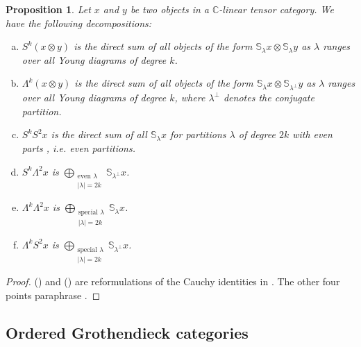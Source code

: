 \documentclass[11pt]{article}
\theoremstyle{plain}
\newtheorem{proposition}[lemma]{Proposition}
\theoremstyle{nonumberplain}
\theoremstyle{plain}
\numberwithin{equation}{section}
\theoremstyle{nonumberplain}
\newtheorem{proof}{Proof}
\newcommand\bC{{\mathbb C}}
\newcommand\bS{{\mathbb S}}
\newcommand\1{{\bf 1}}
\begin{document}
\begin{proposition}\label{pr.plth}
  Let $x$ and $y$ be two objects in a $\bC$-linear tensor category. We have the following decompositions:
  \begin{enumerate}[(a)]
  \item\label{item:1} $S^k(x\otimes y)$ is the direct sum of all objects of the form $\mathbb{S}_{\lambda}x\otimes \mathbb{S}_{\lambda}y$ as $\lambda$ ranges over all Young diagrams of degree $k$.
  \item\label{item:2} $\Lambda^k(x\otimes y)$ is the direct sum of all objects of the form $\mathbb{S}_{\lambda}x\otimes \mathbb{S}_{\lambda^{\perp}}y$ as $\lambda$ ranges over all Young diagrams of degree $k$, where $\lambda^{\perp}$ denotes the conjugate partition.
  \item\label{item:10} $S^k S^2 x$ is the direct sum of all $\bS_{\lambda}x$ for partitions $\lambda$ of degree $2k$ with even parts , i.e. {\it even partitions}. 
  \item\label{item:11} $S^k \Lambda^2 x$ is $\bigoplus_{\substack{\text{even }\lambda \\ |\lambda|=2k}}\bS_{\lambda^{\perp}}x$.
  \item\label{item:12} $\Lambda^k\Lambda^2 x$ is $\bigoplus_{\substack{\text{special }\lambda \\ |\lambda|=2k}}\bS_{\lambda}x$.
  \item\label{item:13} $\Lambda^k S^2 x$ is $\bigoplus_{\substack{\text{special }\lambda \\ |\lambda|=2k}}\bS_{\lambda^{\perp}}x$.    
  \end{enumerate}
\end{proposition}
\begin{proof}
  () and () are reformulations of the Cauchy identities in \cite[(6.2.8)]{ss-intro}. %
  The other four points paraphrase \cite[Example I.8.6]{macd-bk}.
\end{proof}

\subsection{Ordered Grothendieck categories}\label{sec:orderedgrothendieckcat}
\end{document}
